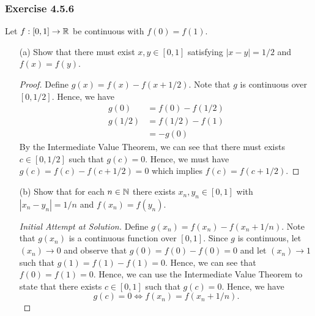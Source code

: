 \subsubsection{Exercise 4.5.6} Let \( f: [0,1] \to \mathbb{R}  \) be continuous with \( f(0) = f(1)  \).
\begin{enumerate}
    \item[(a)] Show that there must exist \( x,y \in [0,1]  \) satisfying \( | x - y  | = 1 / 2  \) and \( f(x) = f(y)  \).
        \begin{proof}
            Define \( g(x) = f(x) - f(x + 1/2)   \). Note that \( g  \) is continuous over \( [0,1/2 ] \). Hence, we have 
            \begin{align*}
                g(0) &= f(0) - f(1/2) \tag{1} \\
                g(1/2) &= f(1/2) - f(1) \\
                       &= -g(0) \tag{2}
            \end{align*}
            By the Intermediate Value Theorem, we can see that there must exists \( c \in [0,1/2]  \) such that \( g(c) = 0  \). Hence, we must have \(g(c) =  f(c) - f(c + 1/2) = 0  \) which implies \(  f(c) = f(c + 1/2) \). 
        \end{proof}
    \item[(b)] Show that for each \( n \in \mathbb{N}  \) there exists \( x_n ,y_n \in [0,1]  \) with \( | x_n - y_n  | = 1/n  \) and \( f(x_n) = f(y_n)  \).

        \begin{proof}[Initial Attempt at Solution]
            Define \( g(x_n) = f(x_n) - f(x_n + 1/n) \). Note that \( g(x_n)  \) is a continuous function over \( [0, 1] \). Since \( g  \) is continuous, let \( (x_n) \to 0  \) and observe that \( g(0) = f(0) - f(0) = 0  \) and let \( (x_n) \to 1  \) such that \( g(1) = f(1) - f(1) = 0  \). Hence, we can see that \( f(0) = f(1) = 0  \). Hence, we can use the Intermediate Value Theorem to state that there exists \( c \in [0,1]  \) such that \( g(c) = 0  \). Hence, we have 
            \[  g(c) = 0 \iff f(x_n) = f(x_n + 1/n).\]
        \end{proof}


\end{enumerate}
